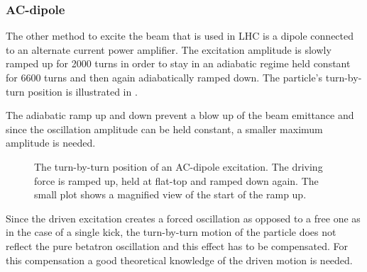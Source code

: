 \subsubsection{AC-dipole}

The other method to excite the beam that is used in LHC is a dipole connected to an alternate current
power amplifier. The excitation amplitude is slowly ramped up for 2000 turns in order to stay in an
adiabatic regime held constant for 6600 turns and then again adiabatically ramped down.
The particle's turn-by-turn position is illustrated in .

The adiabatic ramp up and down prevent a blow up of the beam emittance and since the oscillation amplitude
can be held constant, a smaller maximum amplitude is needed. 

\begin{figure}[h]
    \centering
    \caption{
        The turn-by-turn position of an AC-dipole excitation. The driving force is ramped up,
        held at flat-top and ramped down again.
        The small plot shows a magnified view of the start of the ramp up.
    }
    \label{fig_ac_plot}
\end{figure}

Since the driven excitation creates a forced oscillation as opposed to a free one as in the case of
a single kick, the turn-by-turn motion of the particle does not reflect the pure betatron oscillation
and this effect has to be compensated. For this compensation a good theoretical knowledge of the driven
motion is needed.

